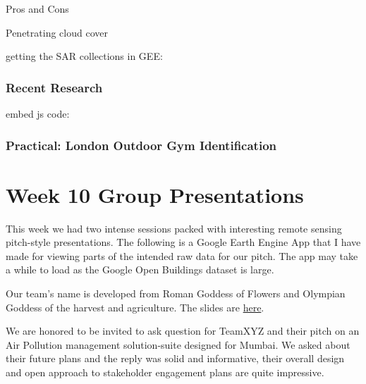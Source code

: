 \documentclass[
  letterpaper,
  DIV=11,
  numbers=noendperiod]{scrreprt}
\begin{document}
Pros and Cons

Penetrating cloud cover

getting the SAR collections in GEE:

\hypertarget{recent-research}{%
\subsection*{Recent Research}\label{recent-research}}

embed js code:

\hypertarget{practical-london-outdoor-gym-identification}{%
\subsection*{Practical: London Outdoor Gym
Identification}\label{practical-london-outdoor-gym-identification}}


\hypertarget{week-10-group-presentations}{%
\chapter*{Week 10 Group
Presentations}\label{week-10-group-presentations}}


This week we had two intense sessions packed with interesting remote
sensing pitch-style presentations. The following is a Google Earth
Engine App that I have made for viewing parts of the intended raw data
for our pitch. The app may take a while to load as the Google Open
Buildings dataset is large.

Our team's name is developed from Roman Goddess of Flowers and Olympian
Goddess of the harvest and agriculture. The slides are
\href{https://dereksgithub.github.io/group_RS_casa0023/}{here}.

We are honored to be invited to ask question for TeamXYZ and their pitch
on an Air Pollution management solution-suite designed for Mumbai. We
asked about their future plans and the reply was solid and informative,
their overall design and open approach to stakeholder engagement plans
are quite impressive.
\end{document}

